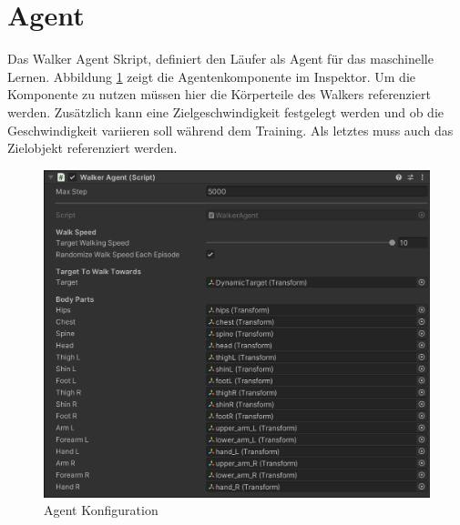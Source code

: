 \section{Agent}
Das Walker Agent Skript, definiert den Läufer als Agent für das maschinelle Lernen. Abbildung \ref{fig:agent_konfiguration} zeigt die Agentenkomponente im Inspektor. Um die Komponente zu nutzen müssen hier die Körperteile des Walkers referenziert werden. Zusätzlich kann eine Zielgeschwindigkeit festgelegt werden und ob die Geschwindigkeit variieren soll während dem Training. Als letztes muss auch das Zielobjekt referenziert werden.
\begin{figure}[H]
  \centering  
  \includegraphics[scale=0.5]{img/agent_konfiguration.png}
  \caption{Agent Konfiguration}
  \label{fig:agent_konfiguration}
\end{figure}

